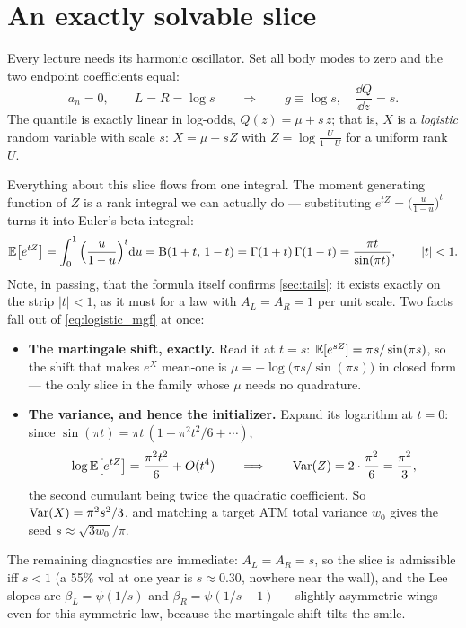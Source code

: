 \documentclass[11pt]{article}
\begin{document}
\section{An exactly solvable slice}
\label{sec:logistic}

Every lecture needs its harmonic oscillator.  Set all body modes to zero and
the two endpoint coefficients equal:
\begin{equation}
a_n=0,\qquad L=R=\log s
\qquad\Longrightarrow\qquad
g\equiv\log s,
\quad \frac{\dd Q}{\dd z}=s .
\end{equation}
The quantile is exactly linear in log-odds, $Q(z)=\mu+s\,z$; that is, $X$ is
a \emph{logistic} random variable with scale $s$:
$X=\mu+sZ$ with $Z=\log\frac{U}{1-U}$ for a uniform rank $U$.

Everything about this slice flows from one integral.  The moment generating
function of $Z$ is a rank integral we can actually do --- substituting
$e^{tZ}=\big(\tfrac{u}{1-u}\big)^{t}$ turns it into Euler's beta integral:
\begin{equation}
\mathbb{E}\big[e^{tZ}\big]
=\int_0^1\Big(\frac{u}{1-u}\Big)^{t}\mathrm{d} u
=\mathrm{B}(1+t,\,1-t)
=\Gamma(1+t)\,\Gamma(1-t)
=\frac{\pi t}{\sin(\pi t)},
\qquad |t|<1 .
\label{eq:logistic_mgf}
\end{equation}
Note, in passing, that the formula itself confirms \cref{sec:tails}: it
exists exactly on the strip $|t|<1$, as it must for a law with $A_L=A_R=1$
per unit scale.  Two facts fall out of \eqref{eq:logistic_mgf} at once:
\begin{itemize}[leftmargin=1.4em]
\item \textbf{The martingale shift, exactly.}  Read it at $t=s$:
$\mathbb{E}[e^{sZ}]=\pi s/\sin(\pi s)$, so the shift that makes $e^{X}$ mean-one is
$\mu=-\log\big(\pi s/\sin(\pi s)\big)$ in closed form --- the only slice in
the family whose $\mu$ needs no quadrature.
\item \textbf{The variance, and hence the initializer.}  Expand its
logarithm at $t=0$: since $\sin(\pi t)=\pi t\,(1-\pi^{2}t^{2}/6+\cdots)$,
\[
\log\mathbb{E}\big[e^{tZ}\big]=\frac{\pi^{2}t^{2}}{6}+O(t^{4})
\qquad\Longrightarrow\qquad
\operatorname{Var}(Z)=2\cdot\frac{\pi^{2}}{6}=\frac{\pi^{2}}{3},
\]
the second cumulant being twice the quadratic coefficient.  So
$\operatorname{Var}(X)=\pi^{2}s^{2}/3$, and matching a target ATM total variance $w_0$
gives the seed $s\approx\sqrt{3w_0}/\pi$.
\end{itemize}
The remaining diagnostics are immediate: $A_L=A_R=s$, so the slice is
admissible iff $s<1$ (a 55\% vol at one year is $s\approx0.30$, nowhere near
the wall), and the Lee slopes are $\beta_L=\psi(1/s)$ and
$\beta_R=\psi(1/s-1)$ --- slightly asymmetric wings even for this symmetric
law, because the martingale shift tilts the smile.
\end{document}
